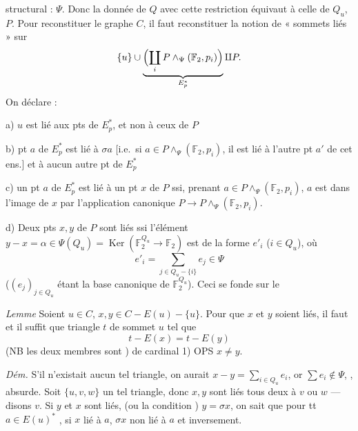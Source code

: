 \documentclass[11pt,a4paper]{article}
\begin{document}

structural : $\Psi$. Donc la donnée de  $Q$ avec cette restriction
équivaut à celle de $Q_u$, $P$. Pour reconstituer le graphe $C$, il faut
reconstituer la notion de « sommets liés » sur
\[
\lbrace u \rbrace \cup \underbrace{\Bigl( \coprod_i P \wedge_{\Psi}
(\mathbb{F}_2, p_i) \Bigr)}_{E_p^{*}} \amalg P .
\]
On déclare :

a) $u$ est lié aux pts de $E_p^{*}$, et non à ceux de $P$

b)   pt $a$ de $E_p^{*}$ est lié à $\sigma a$ [i.e.\ si $a
\in P \wedge_{\Psi} (\mathbb{F}_2, p_i)$, il est lié à l'autre pt $a'$ de cet
ens.] et à aucun autre pt de $E_p^{*}$

c) un pt $a$ de $E_p^{*}$ est lié à un pt \struck{\ill{}} $x$ de $P$ ssi,
prenant $a \in P \wedge_{\Psi} (\mathbb{F}_2, p_i)$, $a$ est dans l'image de
$x$ par l'application canonique $P \to P \wedge_{\Psi} (\mathbb{F}_2, p_i)$.

d) Deux pts $x, y$ de $P$ sont liés ssi l'élément $y - x = \alpha \in
\Psi(Q_u) = \operatorname{Ker}(\mathbb{F}_2^{Q_u} \to \mathbb{F}_2)$ est
\struck{\ill{}} de la forme \struck{\ill{}} $e'_i$ ($i \in Q_u$), où
\[
e'_i = \sum_{j \in Q_u - \lbrace i \rbrace} e_j \in \Psi
\]
($(e_j)_{j \in Q_u}$ étant la base canonique de $\mathbb{F}_2^{Q_u}$). Ceci
se fonde sur le

\emph{Lemme} Soient $u \in C$, $x, y \in C - E(u) - \lbrace u \rbrace$. Pour que
$x$ et $y$ soient liés, il faut et il suffit que     
triangle  $t$ de sommet $u$ tel que
\[
t - E(x) = t - E(y)
\]
(NB les deux membres sont   )  de cardinal 1) OPS $x \neq y$.

\emph{Dém.} S'il n'existait aucun tel triangle, on aurait $x - y = \sum_{i \in
Q_u} e_i$, or $\sum e_i \notin \Psi$, ,
absurde. Soit $\lbrace u, v, w \rbrace$ un tel triangle, donc $x, y$ sont liés
tous deux à $v$ ou $w$ --- disons $v$. Si $y$ et $x$ sont liés,  (ou la condition ) $y = \sigma x$, on sait que pour
tt $a \in E(u)^{*}$ , si $x$ lié à $a$,
$\sigma x$ non lié à $a$ et inversement.
\end{document}
